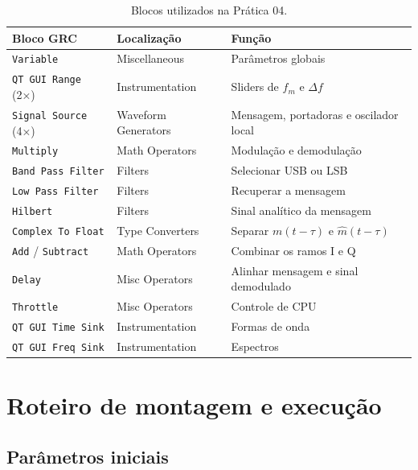 \documentclass[11pt,a4paper]{article}
\begin{document}
\begin{table}[H]
  \centering
  \begin{tabular}{l l l}
    \toprule
    \textbf{Bloco GRC} & \textbf{Localização} & \textbf{Função} \\
    \midrule
    \texttt{Variable}            & Miscellaneous        & Parâmetros globais \\
    \texttt{QT GUI Range} (2×)   & Instrumentation      & Sliders de $f_m$ e $\Delta f$ \\
    \texttt{Signal Source} (4×)  & Waveform Generators  & Mensagem, portadoras e oscilador local \\
    \texttt{Multiply}            & Math Operators       & Modulação e demodulação \\
    \texttt{Band Pass Filter}    & Filters              & Selecionar USB ou LSB \\
    \texttt{Low Pass Filter}     & Filters              & Recuperar a mensagem \\
    \texttt{Hilbert}             & Filters              & Sinal analítico da mensagem \\
    \texttt{Complex To Float}    & Type Converters      & Separar $m(t-\tau)$ e $\hat{m}(t-\tau)$ \\
    \texttt{Add} / \texttt{Subtract} & Math Operators   & Combinar os ramos I e Q \\
    \texttt{Delay}               & Misc Operators       & Alinhar mensagem e sinal demodulado \\
    \texttt{Throttle}            & Misc Operators       & Controle de CPU \\
    \texttt{QT GUI Time Sink}    & Instrumentation      & Formas de onda \\
    \texttt{QT GUI Freq Sink}    & Instrumentation      & Espectros \\
    \bottomrule
  \end{tabular}
  \caption{Blocos utilizados na Prática 04.}
\end{table}

\section{Roteiro de montagem e execução}

\subsection*{Parâmetros iniciais}
\end{document}
